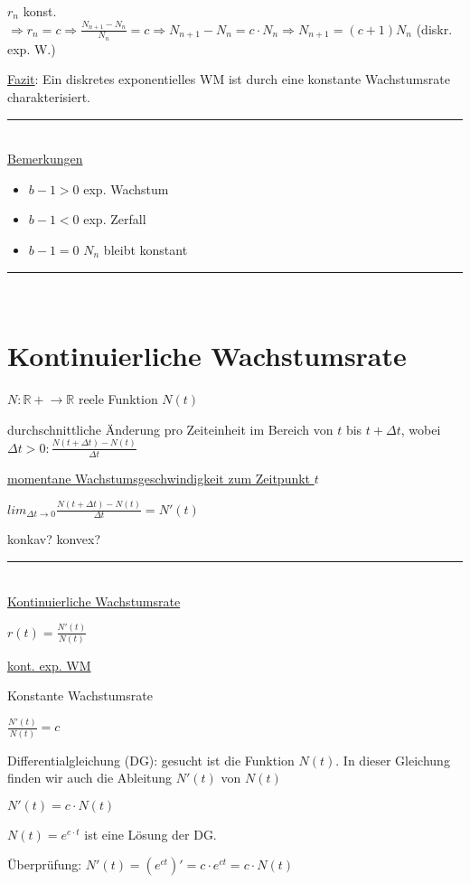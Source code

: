 \documentclass[18pt,a4paper]{scrreprt}
\begin{document}
$r_n$ konst. $\Rightarrow r_n = c \Rightarrow \frac{N_{n+1} - N_n}{N_n} = c \Rightarrow N_{n+1} - N_n = c\cdot N_n \Rightarrow N_{n+1} = (c+1) N_n$ (diskr. exp. W.)

\uline{Fazit}: Ein diskretes exponentielles WM ist durch eine konstante Wachstumsrate charakterisiert.

\rule{\textwidth}{0.4mm}\\

\uline{Bemerkungen}

\begin{itemize}
	\item $b-1 > 0$ exp. Wachstum
	\item $b-1 < 0$ exp. Zerfall
	\item $b-1 = 0$ $N_n$ bleibt konstant
\end{itemize}

\rule{\textwidth}{0.4mm}\\

\section{Kontinuierliche Wachstumsrate}

$N: \mathbb{R+} \rightarrow \mathbb{R}$ reele Funktion $N(t)$

durchschnittliche Änderung pro Zeiteinheit im Bereich von $t$ bis $t+\Delta t$, wobei $\Delta t >0: \frac{N(t+\Delta t) - N(t)}{\Delta t}$

\uline{momentane Wachstumsgeschwindigkeit zum Zeitpunkt $t$}

$lim_{\Delta t \rightarrow 0}\frac{N(t+\Delta t) - N(t)}{\Delta t} = N'(t)$

konkav? konvex?

\rule{\textwidth}{0.4mm}\\

\uline{Kontinuierliche Wachstumsrate}

$r(t) = \frac{N'(t)}{N(t)}$

\uline{kont. exp. WM}

Konstante Wachstumsrate

$\frac{N'(t)}{N(t)} = c$

Differentialgleichung (DG): gesucht ist die Funktion $N(t)$. In dieser Gleichung finden wir auch die Ableitung $N'(t)$ von $N(t)$

$N'(t) = c\cdot N(t)$

$N(t) = e^{c\cdot t}$ ist eine Lösung der DG. 

Überprüfung: $N'(t) = (e^{c t})' = c\cdot e^{c t} = c \cdot N(t)$ \checkmark
\end{document}
